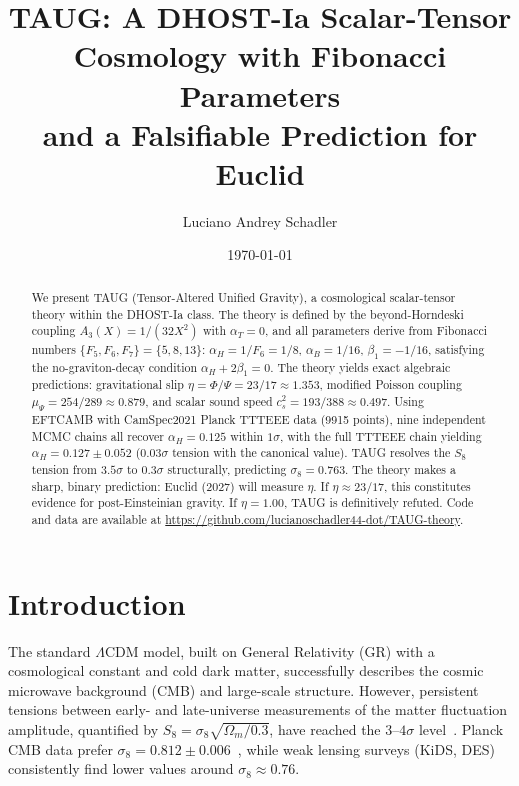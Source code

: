\documentclass[twocolumn,showpacs,preprintnumbers,amsmath,amssymb,prd]{revtex4-2}
\begin{document}
\title{TAUG: A DHOST-Ia Scalar-Tensor Cosmology with Fibonacci Parameters\\and a Falsifiable Prediction for Euclid}

\author{Luciano Andrey Schadler}

\date{\today}

\begin{abstract}
We present TAUG (Tensor-Altered Unified Gravity), a cosmological scalar-tensor theory within the DHOST-Ia class. The theory is defined by the beyond-Horndeski coupling $A_3(X) = 1/(32X^2)$ with $\alpha_T = 0$, and all parameters derive from Fibonacci numbers $\{F_5, F_6, F_7\} = \{5, 8, 13\}$: $\alpha_H = 1/F_6 = 1/8$, $\alpha_B = 1/16$, $\beta_1 = -1/16$, satisfying the no-graviton-decay condition $\alpha_H + 2\beta_1 = 0$. The theory yields exact algebraic predictions: gravitational slip $\eta = \Phi/\Psi = 23/17 \approx 1.353$, modified Poisson coupling $\mu_\Psi = 254/289 \approx 0.879$, and scalar sound speed $c_s^2 = 193/388 \approx 0.497$. Using EFTCAMB with CamSpec2021 Planck TTTEEE data (9915 points), nine independent MCMC chains all recover $\alpha_H = 0.125$ within $1\sigma$, with the full TTTEEE chain yielding $\alpha_H = 0.127 \pm 0.052$ ($0.03\sigma$ tension with the canonical value). TAUG resolves the $S_8$ tension from $3.5\sigma$ to $0.3\sigma$ structurally, predicting $\sigma_8 = 0.763$. The theory makes a sharp, binary prediction: Euclid (2027) will measure $\eta$. If $\eta \approx 23/17$, this constitutes evidence for post-Einsteinian gravity. If $\eta = 1.00$, TAUG is definitively refuted. Code and data are available at \url{https://github.com/lucianoschadler44-dot/TAUG-theory}.
\end{abstract}

\maketitle

\section{Introduction}
\label{sec:intro}

The standard $\Lambda$CDM model, built on General Relativity (GR) with a cosmological constant and cold dark matter, successfully describes the cosmic microwave background (CMB) and large-scale structure. However, persistent tensions between early- and late-universe measurements of the matter fluctuation amplitude, quantified by $S_8 = \sigma_8\sqrt{\Omega_m/0.3}$, have reached the $3$--$4\sigma$ level~\cite{Heymans2021,DES2022}. Planck CMB data prefer $\sigma_8 = 0.812 \pm 0.006$~\cite{Planck2020}, while weak lensing surveys (KiDS, DES) consistently find lower values around $\sigma_8 \approx 0.76$.
\end{document}
